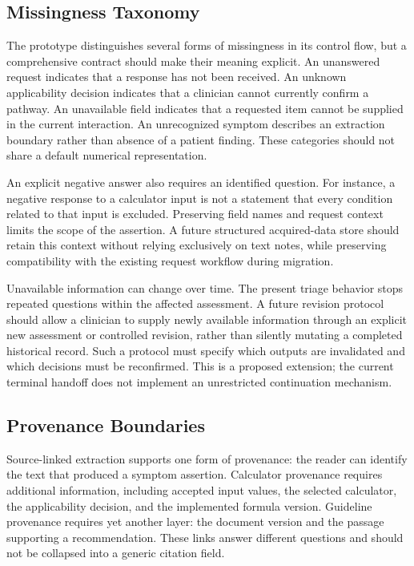 \documentclass[conference]{IEEEtran}
\begin{document}
\subsection{Missingness Taxonomy}
The prototype distinguishes several forms of missingness in its control flow, but a comprehensive contract should make their meaning explicit. An unanswered request indicates that a response has not been received. An unknown applicability decision indicates that a clinician cannot currently confirm a pathway. An unavailable field indicates that a requested item cannot be supplied in the current interaction. An unrecognized symptom describes an extraction boundary rather than absence of a patient finding. These categories should not share a default numerical representation.

An explicit negative answer also requires an identified question. For instance, a negative response to a calculator input is not a statement that every condition related to that input is excluded. Preserving field names and request context limits the scope of the assertion. A future structured acquired-data store should retain this context without relying exclusively on text notes, while preserving compatibility with the existing request workflow during migration.

Unavailable information can change over time. The present triage behavior stops repeated questions within the affected assessment. A future revision protocol should allow a clinician to supply newly available information through an explicit new assessment or controlled revision, rather than silently mutating a completed historical record. Such a protocol must specify which outputs are invalidated and which decisions must be reconfirmed. This is a proposed extension; the current terminal handoff does not implement an unrestricted continuation mechanism.

\subsection{Provenance Boundaries}
Source-linked extraction supports one form of provenance: the reader can identify the text that produced a symptom assertion. Calculator provenance requires additional information, including accepted input values, the selected calculator, the applicability decision, and the implemented formula version. Guideline provenance requires yet another layer: the document version and the passage supporting a recommendation. These links answer different questions and should not be collapsed into a generic citation field.
\end{document}
